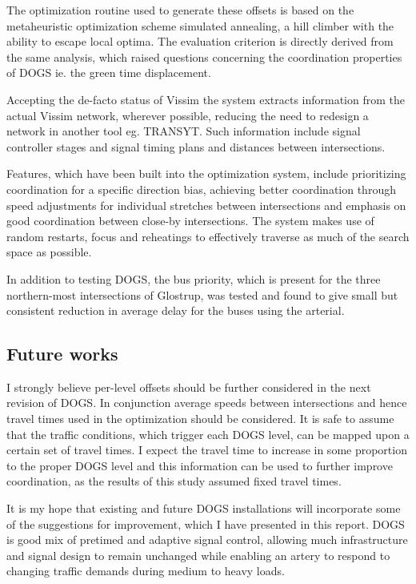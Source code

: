 The optimization routine used to generate these offsets is based on the metaheuristic optimization scheme simulated annealing, a hill climber with the ability to escape local optima. The evaluation criterion is directly derived from the same analysis, which raised questions concerning the coordination properties of DOGS ie. the green time displacement.

Accepting the de-facto status of Vissim the system extracts information from the actual Vissim network, wherever possible, reducing the need to redesign a network in another tool eg. TRANSYT. Such information include signal controller stages and signal timing plans and distances between intersections.

Features, which have been built into the optimization system, include prioritizing coordination for a specific direction bias, achieving better coordination through speed adjustments for individual stretches between intersections and emphasis on good coordination between close-by intersections. The system makes use of random restarts, focus and reheatings to effectively traverse as much of the search space as possible.

In addition to testing DOGS, the bus priority, which is present for the three northern-most intersections of Glostrup, was tested and found to give small but consistent reduction in average delay for the buses using the arterial.

\subsection{Future works}
I strongly believe per-level offsets should be further considered in the next revision of DOGS. In conjunction average speeds between intersections and hence travel times used in the optimization should be considered. It is safe to assume that the traffic conditions, which trigger each DOGS level, can be mapped upon a certain set of travel times. I expect the travel time to increase in some proportion to the proper DOGS level and this information can be used to further improve coordination, as the results of this study assumed fixed travel times.

It is my hope that existing and future DOGS installations will incorporate some of the suggestions for improvement, which I have presented in this report. DOGS is good mix of pretimed and adaptive signal control, allowing much infrastructure and signal design to remain unchanged while enabling an artery to respond to changing traffic demands during medium to heavy loads.

